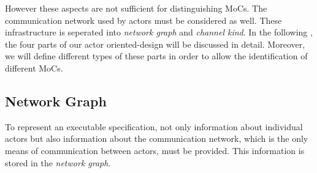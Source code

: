 However these aspects are not sufficient for distinguishing MoCs.
The communication network used by actors must be considered as well.
These infrastructure is seperated into \emph{network graph} and
\emph{channel kind}. In the following , the four parts of our actor
oriented-design will be discussed in detail. Moreover, we will define
different types of these parts in order to allow the identification
of different MoCs.


\subsection{Network Graph}\label{network-graph} 

To represent an executable specification, not only information about
individual actors but also information about the communication network,
which is the only means of communication between actors,
must be provided.
This information is stored in the \emph{network graph}.

